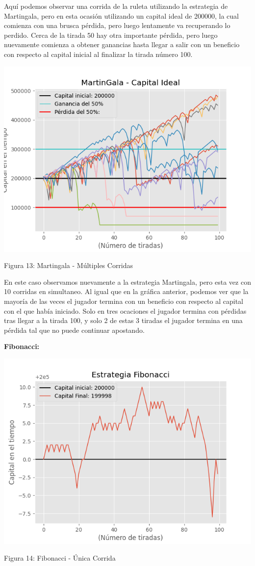 \documentclass{article}
\begin{document}
Aquí podemos observar una corrida de la ruleta utilizando la estrategia de Martingala, pero en esta ocasión utilizando un capital ideal de 200000, la cual comienza con una brusca pérdida, pero luego lentamente va recuperando lo perdido. Cerca de la tirada 50 hay otra importante pérdida, pero luego nuevamente comienza a obtener ganancias hasta llegar a salir con un beneficio con respecto al capital inicial al finalizar la tirada número 100.

\begin{center}
    \includegraphics[width=0.7\linewidth]{MG-ideal-multiplestiradas.png}
    
    \caption{Figura 13: Martingala - Múltiples Corridas}
\end{center}

En este caso observamos nuevamente a la estrategia Martingala, pero esta vez con 10 corridas en simultaneo. Al igual que en la gráfica anterior, podemos ver que la mayoría de las veces el jugador termina con un beneficio con respecto al capital con el que había iniciado. Solo en tres ocaciones el jugador termina con pérdidas tras llegar a la tirada 100, y solo 2 de estas 3 tiradas el jugador termina en una pérdida tal que no puede continuar apostando.

\textbf{Fibonacci:}

\begin{center}
    \includegraphics[width=0.7\linewidth]{FIB-ideal-1tirada.png}
    
    \caption{Figura 14: Fibonacci - Única Corrida}
\end{center}
\end{document}
